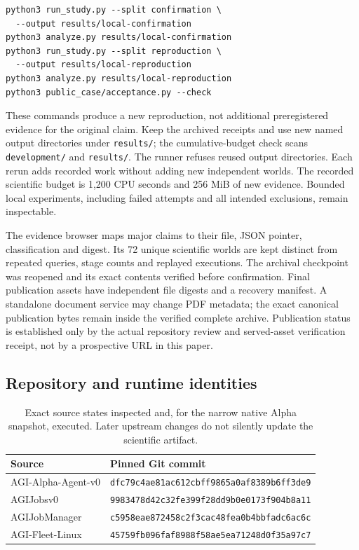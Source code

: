 \documentclass[11pt,letterpaper]{article}
\begin{document}
\begin{verbatim}
python3 run_study.py --split confirmation \
  --output results/local-confirmation
python3 analyze.py results/local-confirmation
python3 run_study.py --split reproduction \
  --output results/local-reproduction
python3 analyze.py results/local-reproduction
python3 public_case/acceptance.py --check
\end{verbatim}
These commands produce a new reproduction, not additional preregistered evidence for the original claim. Keep the archived receipts and use new named output directories under \texttt{results/}; the cumulative-budget check scans \texttt{development/} and \texttt{results/}. The runner refuses reused output directories. Each rerun adds recorded work without adding new independent worlds. The recorded scientific budget is 1,200 CPU seconds and 256 MiB of new evidence. Bounded local experiments, including failed attempts and all intended exclusions, remain inspectable.

The evidence browser maps major claims to their file, JSON pointer, classification and digest. Its 72 unique scientific worlds are kept distinct from repeated queries, stage counts and replayed executions. The archival checkpoint was reopened and its exact contents verified before confirmation. Final publication assets have independent file digests and a recovery manifest. A standalone document service may change PDF metadata; the exact canonical publication bytes remain inside the verified complete archive. Publication status is established only by the actual repository review and served-asset verification receipt, not by a prospective URL in this paper.

\subsection{Repository and runtime identities}
\begin{table}[htbp]
\centering\small
\begin{tabularx}{\textwidth}{@{}p{1.4in}Y@{}}
\toprule
Source & Pinned Git commit \\
\midrule
AGI-Alpha-Agent-v0 & \texttt{dfc79c4ae81ac612cbff9865a0af8389b6ff3de9} \\
AGIJobsv0 & \texttt{9983478d42c32fe399f28dd9b0e0173f904b8a11} \\
AGIJobManager & \texttt{c5958eae872458c2f3cac48fea0b4bbfadc6ac6c} \\
AGI-Fleet-Linux & \texttt{45759fb096faf8988f58ae5ea71248d0f35a97c7} \\
\bottomrule
\end{tabularx}
\caption{Exact source states inspected and, for the narrow native Alpha snapshot, executed. Later upstream changes do not silently update the scientific artifact.}
\label{tab:identities}
\end{table}
\end{document}
